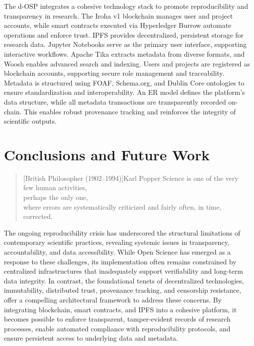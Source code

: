 \documentclass[final]{rc-book-2.14}
\begin{document}
The d-OSP integrates a cohesive technology stack to promote reproducibility and transparency in research. The Iroha v1 blockchain manages user and project accounts, while smart contracts executed via Hyperledger Burrow automate operations and enforce trust. IPFS provides decentralized, persistent storage for research data. Jupyter Notebooks serve as the primary user interface, supporting interactive workflows. Apache Tika extracts metadata from diverse formats, and Woosh enables advanced search and indexing. Users and projects are registered as blockchain accounts, supporting secure role management and traceability. Metadata is structured using FOAF, Schema.org, and Dublin Core ontologies to ensure standardization and interoperability. An ER model defines the platform’s data structure, while all metadata transactions are transparently recorded on-chain. This enables robust provenance tracking and reinforces the integrity of scientific outputs.

\chapter{Conclusions and Future Work}
\label{chp:conclusions}

\begin{quotation}[British Philosopher (1902–1994)]{Karl Popper}
    Science is one of the very few human activities, \\
    perhaps the only one, \\
    where errors are systematically criticized and fairly often, in time, corrected.
\end{quotation}

\drop The ongoing reproducibility crisis has underscored the structural limitations of contemporary scientific practices, revealing systemic issues in transparency, accountability, and data accessibility. While Open Science has emerged as a response to these challenges, its implementation often remains constrained by centralized infrastructures that inadequately support verifiability and long-term data integrity. In contrast, the foundational tenets of decentralized technologies, immutability, distributed trust, provenance tracking, and censorship resistance, offer a compelling architectural framework to address these concerns. By integrating blockchain, smart contracts, and IPFS into a cohesive platform, it becomes possible to enforce transparent, tamper-evident records of research processes, enable automated compliance with reproducibility protocols, and ensure persistent access to underlying data and metadata.
\end{document}
